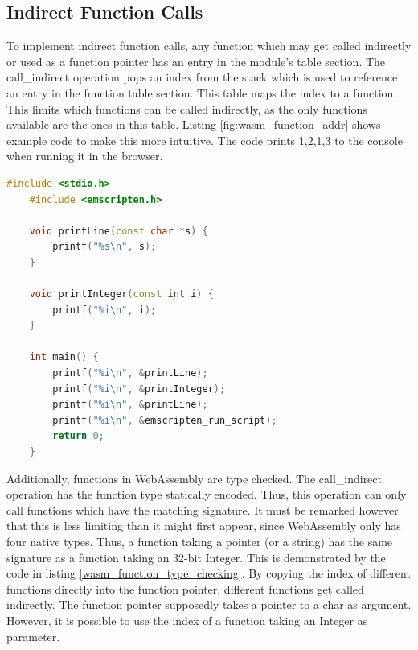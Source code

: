 \documentclass[sigconf]{acmart}
\begin{document}
\subsection{Indirect Function Calls} 
\label{sec:indirect_calls}
To implement indirect function calls, any function which may get called indirectly or used as a function pointer has an entry in the module's table section. The call\_indirect operation pops an index from the stack which is used to reference an entry in the function table section. This table maps the index to a function. This limits which functions can be called indirectly, as the only functions available are the ones in this table. Listing \ref{fig:wasm_function_addr} shows example code to make this more intuitive. The code prints 1,2,1,3 to the console when running it in the browser.

\begin{lstlisting}[language=C++, caption={This Code demonstrates how WebAssembly handles function pointers. This code prints 1,2,1,3 to the console when running it in the browser.}, label={fig:wasm_function_addr}]
	#include <stdio.h>
	#include <emscripten.h>

	void printLine(const char *s) {
		printf("%s\n", s);
	}

	void printInteger(const int i) {
		printf("%i\n", i);
	}

	int main() {
		printf("%i\n", &printLine);
		printf("%i\n", &printInteger);
		printf("%i\n", &printLine);
		printf("%i\n", &emscripten_run_script);
		return 0;
	}
\end{lstlisting}

Additionally, functions in WebAssembly are type checked. The call\_indirect operation has the function type statically encoded. Thus, this operation can only call functions which have the matching signature. It must be remarked however that this is less limiting than it might first appear, since WebAssembly only has four native types. Thus, a function taking a pointer (or a string) has the same signature as a function taking an 32-bit Integer. This is demonstrated by the code in listing \ref{wasm_function_type_checking}. By copying the index of different functions directly into the function pointer, different functions get called indirectly. The function pointer supposedly takes a pointer to a char as argument. However, it is possible to use the index of a function taking an Integer as parameter. 
\end{document}
